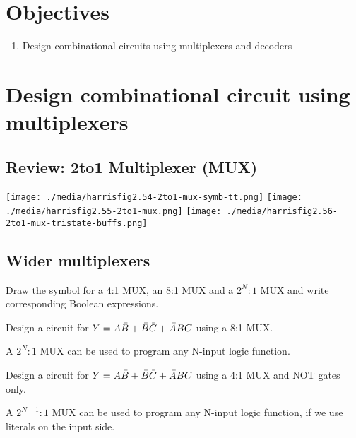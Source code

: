 
\section{Objectives}
\begin{enumerate}
   \item Design combinational circuits using multiplexers and decoders
\end{enumerate}

\section{Design combinational circuit using multiplexers ~\cite[Section~2.8.1]{harris2022digital}}

\subsection{Review: 2to1 Multiplexer (MUX)}
\texttt{[image: ./media/harrisfig2.54-2to1-mux-symb-tt.png]}
\texttt{[image: ./media/harrisfig2.55-2to1-mux.png]}
\texttt{[image: ./media/harrisfig2.56-2to1-mux-tristate-buffs.png]}

\subsection{Wider multiplexers}
Draw the symbol for a 4:1 MUX, an 8:1 MUX and a $2^N:1$ MUX and write
corresponding Boolean expressions.
\vspace{10em}


\begin{example}
  Design a circuit for $Y = A\bar{B} + \bar{B} \bar{C} + \bar{A} B C$ using a 8:1 MUX.
\end{example}
\vspace{10em}

\begin{remark}
  A $2^N:1$ MUX can be used to program any N-input logic function.
\end{remark}

\begin{example}
  Design a circuit for $Y = A\bar{B} + \bar{B} \bar{C} + \bar{A} B C$ using a 4:1 MUX and 
  NOT gates only.
\end{example}
\vspace{10em}

\begin{remark}
  A $2^{N-1}:1$ MUX can be used to program any N-input logic function, if we use
  literals on the input side.
\end{remark}

